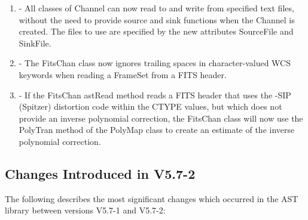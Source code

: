 \documentclass[twoside,11pt]{starlink}
\begin{document}
\begin{enumerate}

\item - All classes of Channel can now read to and write from specified
text files, without the need to provide source and sink functions when
the Channel is created. The files to use are specified by the new
attributes SourceFile and SinkFile.

\item - The FitsChan class now ignores trailing spaces in character-valued WCS
keywords when reading a FrameSet from a FITS header.

\item - If the FitsChan astRead method reads a FITS header that uses the
-SIP (Spitzer) distortion code within the CTYPE values, but which does
not provide an inverse polynomial correction, the FitsChan class will now
use the PolyTran method of the PolyMap class to create an estimate of the
inverse polynomial correction.

\end{enumerate}


\subsection{Changes Introduced in V5.7-2}

The following describes the most significant changes which
occurred in the AST library between versions V5.7-1 and V5.7-2:
\end{document}

